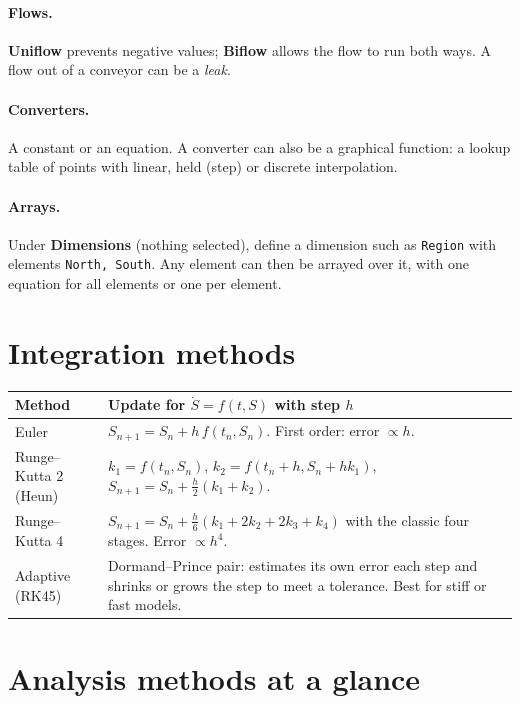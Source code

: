 \documentclass[11pt,oneside]{book}
\newcommand{\ui}[1]{\textsf{\textbf{#1}}}                       %
\newcommand{\el}[1]{\texttt{#1}}                                %
\begin{document}
\paragraph{Flows.} \ui{Uniflow} prevents negative values; \ui{Biflow} allows
the flow to run both ways. A flow out of a conveyor can be a \emph{leak}.

\paragraph{Converters.} A constant or an equation. A converter can also be a
graphical function: a lookup table of points with linear, held (step) or
discrete interpolation.

\paragraph{Arrays.} Under \ui{Dimensions} (nothing selected), define a
dimension such as \el{Region} with elements \el{North, South}. Any element
can then be arrayed over it, with one equation for all elements or one per
element.

\section{Integration methods}\label{sec:methods}

\begin{center}
\renewcommand{\arraystretch}{1.3}
\begin{tabularx}{\textwidth}{@{}l X@{}}
\toprule
\textbf{\sffamily Method} & \textbf{\sffamily Update for $\dot S = f(t, S)$ with step $h$}\\
\midrule
Euler & $S_{n+1} = S_n + h\,f(t_n, S_n)$. First order: error $\propto h$.\\
Runge--Kutta 2 (Heun) & $k_1 = f(t_n,S_n)$, $k_2 = f(t_n + h, S_n + h k_1)$, $S_{n+1} = S_n + \tfrac{h}{2}(k_1 + k_2)$.\\
Runge--Kutta 4 & $S_{n+1} = S_n + \tfrac{h}{6}(k_1 + 2k_2 + 2k_3 + k_4)$ with the classic four stages. Error $\propto h^{4}$.\\
Adaptive (RK45) & Dormand--Prince pair: estimates its own error each step and shrinks or grows the step to meet a tolerance. Best for stiff or fast models.\\
\bottomrule
\end{tabularx}
\end{center}

\section{Analysis methods at a glance}
\end{document}
